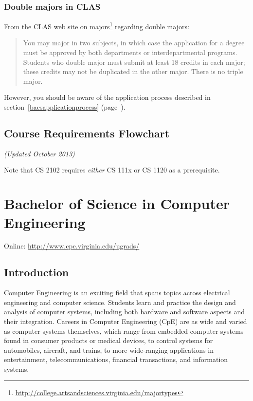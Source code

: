 \documentclass[10pt,letter,twocolumn]{book}
\newcommand{\mychapter}[2]{\chapter{#1}\renewcommand{\leftmark}{\textsc{#2}}}
\newcommand{\mysection}[1]{\section{#1}\renewcommand{\rightmark}{#1}}
\newcommand{\myurl}[1]{\footnote{\scriptsize\url{#1}}}
\begin{document}
\subsection{Double majors in CLAS}

From the CLAS web site on
majors\myurl{http://college.artsandsciences.virginia.edu/majortypes}
regarding double majors:

\begin{quotation}
\noindent You may major in two subjects, in which case the application
for a degree must be approved by both departments or inter\-departmental
programs. Students who double major must submit at least 18 credits in
each major; these credits may not be duplicated in the other
major. There is no triple major.
\end{quotation}

However, you should be aware of the application process described in
section~\ref{bacsapplicationprocess}
(page~\pageref{bacsapplicationprocess}).

\mysection{Course Requirements Flowchart}

\begin{figure*}[h!]
\label{fig:barequirementsflowchart}
{\em (Updated October 2013)}
\begin{center}
\end{center}
\end{figure*}

Note that CS 2102 requires {\em either} CS 111x or CS 1120 as a
prerequisite.


\clearpage
\mychapter{Bachelor of Science in Computer Engineering}{BS CpE Degree}
\label{bscpechapter}

\noindent Online: \url{http://www.cpe.virginia.edu/ugrads/}

\mysection{Introduction}

Computer Engineering is an exciting field that spans topics across
electrical engineering and computer science.  Students learn and
practice the design and analysis of computer systems, including both
hardware and software aspects and their integration. Careers in
Computer Engineering (CpE) are as wide and varied as computer systems
themselves, which range from embedded computer systems found in
consumer products or medical devices, to control systems for
automobiles, aircraft, and trains, to more wide-ranging applications
in entertainment, telecommunications, financial transactions, and
information systems.
\end{document}
